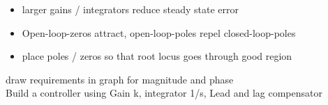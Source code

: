 \begin{itemize}
    \item larger gains / integrators reduce steady state error
    \item Open-loop-zeros attract, open-loop-poles repel closed-loop-poles
    \item place poles / zeros so that root locus goes through good region
\end{itemize}

draw requirements in graph for magnitude and phase\\
Build a controller using Gain k, integrator 1/s, Lead and lag compensator